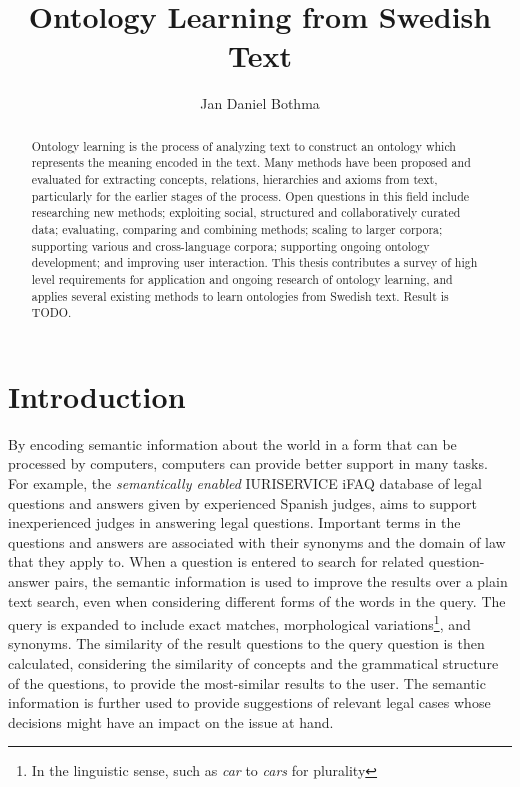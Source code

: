 \documentclass[a4paper]{report}
\title{Ontology Learning from Swedish Text}
\author{Jan Daniel Bothma}
\begin{document}
\maketitle

\begin{abstract}
Ontology learning is the process of analyzing text to construct an ontology which represents the meaning encoded in the text.
Many methods have been proposed and evaluated for extracting concepts, relations, hierarchies and axioms from text, particularly for the earlier stages of the process.
Open questions in this field include researching new methods; exploiting social, structured and collaboratively curated data; evaluating, comparing and combining methods; scaling to larger corpora; supporting various and cross-language corpora; supporting ongoing ontology development; and improving user interaction.
This thesis contributes a survey of high level requirements for application and ongoing research of ontology learning, and applies several existing methods to learn ontologies from Swedish text.
Result is TODO.
\end{abstract}	

\tableofcontents

\chapter{Introduction}

By encoding semantic information about the world in a form that can be processed by computers, computers can provide better support in many tasks.
For example, the \emph{semantically enabled} IURISERVICE iFAQ database of legal questions and answers given by experienced Spanish judges, aims to support inexperienced judges in answering legal questions\cite{IURISERVICEPerformance2007}.
Important terms in the questions and answers are associated with their synonyms and the domain of law that they apply to.
When a question is entered to search for related question-answer pairs, the semantic information is used to improve the results over a plain text search, even when considering different forms of the words in the query.
The query is expanded to include exact matches, morphological variations\footnote{In the linguistic sense, such as \emph{car} to \emph{cars} for plurality}, and synonyms.
The similarity of the result questions to the query question is then calculated, considering the similarity of concepts and the grammatical structure of the questions, to provide the most-similar results to the user.
The semantic information is further used to provide suggestions of relevant legal cases whose decisions might have an impact on the issue at hand.
\end{document}
